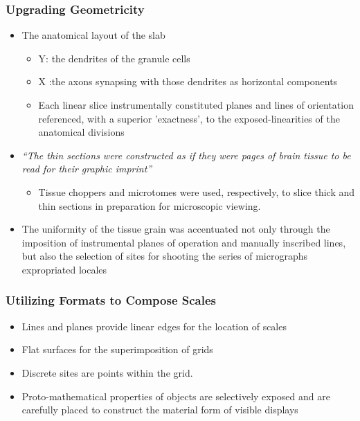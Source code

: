 \documentclass[a4paper]{article}
\begin{document}
\subsubsection{Upgrading Geometricity}
\begin{itemize}
	\item The anatomical layout of the slab
	\begin{itemize}[label=$\circ$]
		\item Y: the dendrites of the granule cells
		\item X :the axons synapsing with those dendrites as horizontal components
		\item Each linear slice instrumentally constituted planes and lines of orientation referenced, with a superior 'exactness', to the exposed-linearities of the anatomical divisions
	\end{itemize}
	\item \textit{“The thin sections were constructed as if they were pages of brain tissue to be read for their graphic imprint”}
	\begin{itemize}[label=$\circ$]
		\item Tissue choppers and microtomes were used, respectively, to slice thick and thin sections in preparation for microscopic viewing.
	\end{itemize}
	\item The uniformity of the tissue grain was accentuated not only through the imposition of instrumental planes of operation and manually inscribed lines, but also the selection of sites for shooting the series of micrographs expropriated locales
\end{itemize}

\subsubsection{Utilizing Formats to Compose Scales}
\begin{itemize}
	\item Lines and planes provide linear edges for the location of scales 
	\item Flat surfaces for the superimposition of grids
	\item Discrete sites are points within the grid.
	\item Proto-mathematical properties of objects are selectively exposed and are carefully placed to construct the material form of visible displays
\end{itemize}
\end{document}
